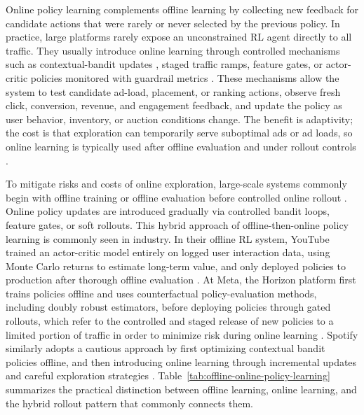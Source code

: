 \documentclass[manuscript,review,screen]{acmart}
\begin{document}
Online policy learning complements offline learning by collecting new feedback for candidate actions that were rarely or never selected by the previous policy. In practice, large platforms rarely expose an unconstrained RL agent directly to all traffic. They usually introduce online learning through controlled mechanisms such as contextual-bandit updates \cite{li2010contextual, bietti2021contextual, van2024practical, Mehrotra2020}, staged traffic ramps, feature gates, or actor-critic policies monitored with guardrail metrics \cite{gauci2018horizon, chen2022off, xu2023optimizing}. These mechanisms allow the system to test candidate ad-load, placement, or ranking actions, observe fresh click, conversion, revenue, and engagement feedback, and update the policy as user behavior, inventory, or auction conditions change. The benefit is adaptivity; the cost is that exploration can temporarily serve suboptimal ads or ad loads, so online learning is typically used after offline evaluation and under rollout controls \cite{dulac2021challenges, chen2022off, gauci2018horizon, xu2023optimizing}. 

To mitigate risks and costs of online exploration, large-scale systems commonly begin with offline training or offline evaluation before controlled online rollout \cite{levine2020offline, chen2022off, gauci2018horizon}. Online policy updates are introduced gradually via controlled bandit loops, feature gates, or soft rollouts. This hybrid approach of offline-then-online policy learning is commonly seen in industry. In their offline RL system, YouTube trained an actor-critic model entirely on logged user interaction data, using Monte Carlo returns to estimate long-term value, and only deployed policies to production after thorough offline evaluation \cite{chen2022off}. At Meta, the Horizon platform first trains policies offline and uses counterfactual policy-evaluation methods, including doubly robust estimators, before deploying policies through gated rollouts, which refer to the controlled and staged release of new policies to a limited portion of traffic in order to minimize risk during online learning \cite{gauci2018horizon}. Spotify similarly adopts a cautious approach by first optimizing contextual bandit policies offline, and then introducing online learning through incremental updates and careful exploration strategies \cite{Mehrotra2020}. Table~\ref{tab:offline-online-policy-learning} summarizes the practical distinction between offline learning, online learning, and the hybrid rollout pattern that commonly connects them.
\end{document}
